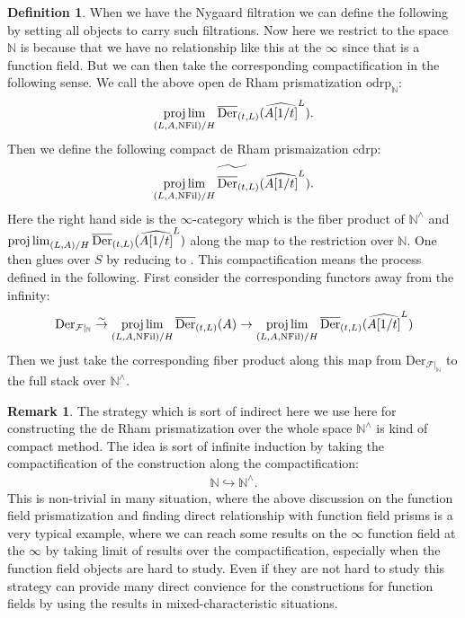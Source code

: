 \documentclass[12pt]{article}
\theoremstyle{definition}
\newtheorem{remark}{Remark}
\newtheorem{definition}{Definition}
\begin{document}
\begin{definition}
When we have the Nygaard filtration we can define the following by setting all objects to carry such filtrations. Now here we restrict to the space $\mathbb{N}$ is because that we have no relationship like this at the $\infty$ since that is a function field. But we can then take the corresponding compactification in the following sense. We call the above open de Rham prismatization $\mathrm{odrp}_\mathbb{N}$:
\begin{align}
\projlim_{(L,A,\mathrm{NFil})/H}\overline{\mathrm{Der}}_{(t,L)}(\widehat{A[1/t]}^{L}).
\end{align}
Then we define the following compact de Rham prismaization $\mathrm{cdrp}$:
\begin{align}
\widetilde{\projlim_{(L,A,\mathrm{NFil})/H}\overline{\mathrm{Der}}_{(t,L)}(\widehat{A[1/t]}^{L})}.
\end{align}
Here the right hand side is the $\infty$-category which is the fiber product of $\mathbb{N}^\wedge$ and $\projlim_{(L,A)/H}\overline{\mathrm{Der}}_{(t,L)}(\widehat{A[1/t]}^{L})$ along the map to the restriction over $\mathbb{N}$. 
One then glues over $S$ by reducing to \cite{2BL}. This compactification means the process defined in the following. First consider the corresponding functors away from the infinity:
\begin{align}
\mathrm{Der}_{\mathcal{F}|_{\mathbb{N}}}\overset{\sim}{\rightarrow} \projlim_{(L,A,\mathrm{NFil})/H}\overline{\mathrm{Der}}_{(t,L)}(A) \overset{}{\rightarrow} \projlim_{(L,A,\mathrm{NFil})/H}\overline{\mathrm{Der}}_{(t,L)}(\widehat{A[1/t]}^L)
\end{align}
Then we just take the corresponding fiber product along this map from $\mathrm{Der}_{\mathcal{F}|_{\mathbb{N}}}$ to the full stack over $\mathbb{N}^\wedge$.
\end{definition}


\begin{remark}
The strategy which is sort of indirect here we use here for constructing the de Rham prismatization over the whole space $\mathbb{N}^\wedge$ is kind of compact method. The idea is sort of infinite induction by taking the compactification of the construction along the compactification:
\begin{align}
\mathbb{N} \hookrightarrow \mathbb{N}^\wedge.
\end{align} 
This is non-trivial in many situation, where the above discussion on the function field prismatization and finding direct relationship with function field prisms is a very typical example, where we can reach some results on the $\infty$ function field at the $\infty$ by taking limit of results over the compactification, especially when the function field objects are hard to study. Even if they are not hard to study this strategy can provide many direct convience for the constructions for function fields by using the results in mixed-characteristic situations.
\end{remark}
\end{document}
